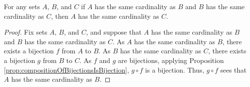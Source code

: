 \guard




\begin{prop}
\label{prop:cardinalityIsSymmetric}
  For any sets $A$, $B$, and $C$ if $A$ has the same cardinality as $B$ and $B$ has the same cardinality as $C$, then $A$ has the same cardinality as $C$.
\end{prop}
\begin{proof}
  Fix sets $A$, $B$, and $C$, and suppose that $A$ has the same cardinality as $B$ and $B$ has the same cardinality as $C$.
  As $A$ has the same cardinality as $B$, there exists a bijection $f$ from $A$ to $B$.
  As $B$ has the same cardinality as $C$, there exists a bijection $g$ from $B$ to $C$.
  As $f$ and $g$ are bijections, applying Proposition \ref{prop:compositionOfBijectionsIsBijection}, $g\circ f$ is a bijection.
  Thus, $g\circ f$ sees that $A$ has the same cardinality as $B$.
\end{proof}
